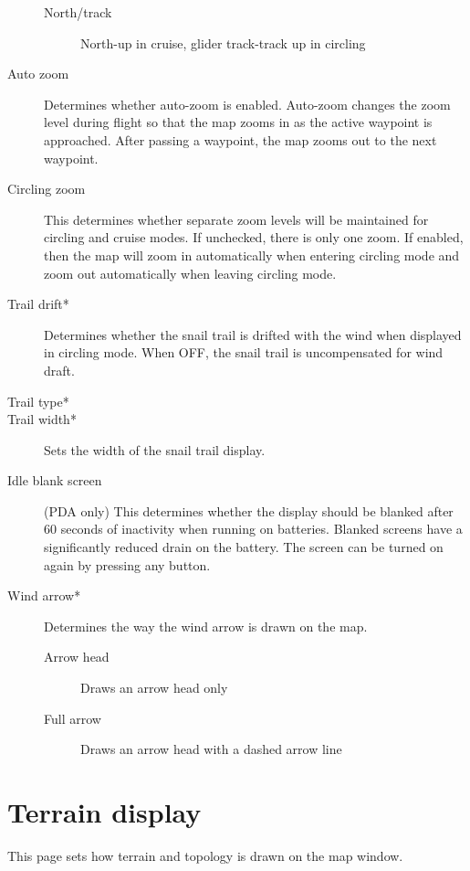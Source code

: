\documentclass[a4paper,12pt]{refrep}
\begin{document}
\begin{description}
\begin{description}
\item[North/track] North-up in cruise, glider track-track up in circling
\end{description}
\item[Auto zoom] Determines whether auto-zoom is enabled.  Auto-zoom changes
the zoom level during flight so that the map zooms in as the active waypoint
is approached.  After passing a waypoint, the map zooms out to the next waypoint.  
\item[Circling zoom]  This determines whether separate zoom levels
will be maintained for circling and cruise modes.  If unchecked, there
is only one zoom.  If enabled, then the map will zoom in automatically
when entering circling mode and zoom out automatically when leaving
circling mode.
\item[Trail drift*] Determines whether the
snail trail is drifted with the wind when displayed in circling mode.  When OFF, the snail trail is 
uncompensated for wind draft.
\item[Trail type*] 
\item[Trail width*] Sets the width of the snail trail display.
\item[Idle blank screen] (PDA only)
This determines whether the display should be blanked after 60 seconds
of inactivity when running on batteries.  Blanked screens have a
significantly reduced drain on the battery.  The screen can be turned
on again by pressing any button.
\item[Wind arrow*]  Determines the way the wind arrow is drawn on the map.
\begin{description}
\item[Arrow head] Draws an arrow head only
\item[Full arrow] Draws an arrow head with a dashed arrow line
\end{description}
\end{description}


\clearpage
\section{Terrain display}\label{sec:terrain-display}

This page sets how terrain and topology is drawn on the map window.
\end{document}
